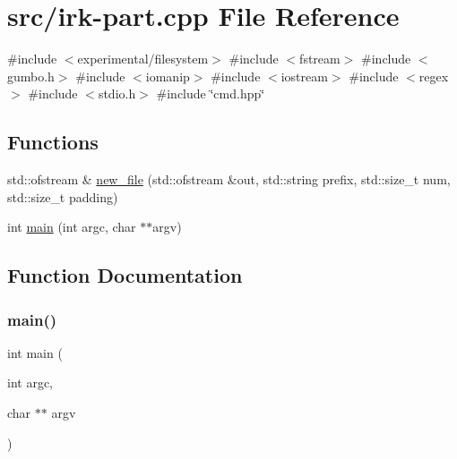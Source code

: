 \hypertarget{irk-part_8cpp}{}\section{src/irk-\/part.cpp File Reference}
\label{irk-part_8cpp}
{\ttfamily \#include $<$experimental/filesystem$>$}\newline
{\ttfamily \#include $<$fstream$>$}\newline
{\ttfamily \#include $<$gumbo.\+h$>$}\newline
{\ttfamily \#include $<$iomanip$>$}\newline
{\ttfamily \#include $<$iostream$>$}\newline
{\ttfamily \#include $<$regex$>$}\newline
{\ttfamily \#include $<$stdio.\+h$>$}\newline
{\ttfamily \#include \char`\"{}cmd.\+hpp\char`\"{}}\newline
\subsection*{Functions}
\begin{DoxyCompactItemize}
\item 
std\+::ofstream \& \mbox{\hyperlink{irk-part_8cpp_ac847d7f963015a5fe6bcc99b24a2f5b4}{new\+\_\+file}} (std\+::ofstream \&out, std\+::string prefix, std\+::size\+\_\+t num, std\+::size\+\_\+t padding)
\item 
int \mbox{\hyperlink{irk-part_8cpp_a3c04138a5bfe5d72780bb7e82a18e627}{main}} (int argc, char $\ast$$\ast$argv)
\end{DoxyCompactItemize}


\subsection{Function Documentation}
\mbox{\label{irk-part_8cpp_a3c04138a5bfe5d72780bb7e82a18e627}} 
\subsubsection{\texorpdfstring{main()}{main()}}
{\footnotesize\ttfamily int main (\begin{DoxyParamCaption}\item[{int}]{argc,  }\item[{char $\ast$$\ast$}]{argv }\end{DoxyParamCaption})}

